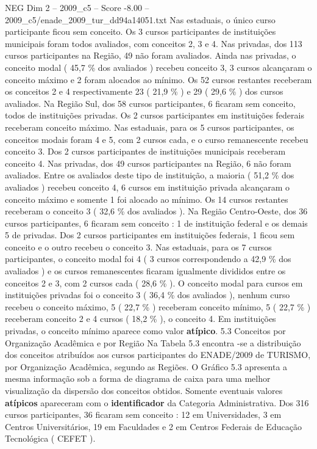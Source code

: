 \begin{textsample}{NEG Dim 2 – 2009\_c5 – Score -8.00 – 2009\_c5/enade\_2009\_tur\_dd94a14051.txt}
Nas estaduais, o único curso participante ficou sem conceito.
Os 3 cursos participantes de instituições municipais foram todos avaliados, com conceitos 2, 3 e 4.
Nas privadas, dos 113 cursos participantes na Região, 49 não foram avaliados.
Ainda nas privadas, o conceito modal ( 45,7 \% dos avaliados ) recebeu conceito 3, 3 cursos alcançaram o conceito máximo e 2 foram alocados ao mínimo.
Os 52 cursos restantes receberam os conceitos 2 e 4 respectivamente 23 ( 21,9 \% ) e 29 ( 29,6 \% ) dos cursos avaliados.
Na Região Sul, dos 58 cursos participantes, 6 ficaram sem conceito, todos de instituições privadas.
Os 2 cursos participantes em instituições federais receberam conceito máximo.
Nas estaduais, para os 5 cursos participantes, os conceitos modais foram 4 e 5, com 2 cursos cada, e o curso remanescente recebeu conceito 3.
Dos 2 cursos participantes de instituições municipais receberam conceito 4.
Nas privadas, dos 49 cursos participantes na Região, 6 não foram avaliados.
Entre os avaliados deste tipo de instituição, a maioria ( 51,2 \% dos avaliados ) recebeu conceito 4, 6 cursos em instituição privada alcançaram o conceito máximo e somente 1 foi alocado ao mínimo.
Os 14 cursos restantes receberam o conceito 3 ( 32,6 \% dos avaliados ).
Na Região Centro-Oeste, dos 36 cursos participantes, 6 ficaram sem conceito : 1 de instituição federal e os demais 5 de privadas.
Dos 2 cursos participantes em instituições federais, 1 ficou sem conceito e o outro recebeu o conceito 3.
Nas estaduais, para os 7 cursos participantes, o conceito modal foi 4 ( 3 cursos correspondendo a 42,9 \% dos avaliados ) e os cursos remanescentes ficaram igualmente divididos entre os conceitos 2 e 3, com 2 cursos cada ( 28,6 \% ).
O conceito modal para cursos em instituições privadas foi o conceito 3 ( 36,4 \% dos avaliados ), nenhum curso recebeu o conceito máximo, 5 ( 22,7 \% ) receberam conceito mínimo, 5 ( 22,7 \% ) receberam conceito 2 e 4 cursos ( 18,2 \% ), o conceito 4.
Em instituições privadas, o conceito mínimo aparece como valor \textbf{atípico}. 5.3 Conceitos por Organização Acadêmica e por Região Na Tabela 5.3 encontra -se a distribuição dos conceitos atribuídos aos cursos participantes do ENADE/2009 de TURISMO, por Organização Acadêmica, segundo as Regiões.
O Gráfico 5.3 apresenta a mesma informação sob a forma de diagrama de caixa para uma melhor visualização da dispersão dos conceitos obtidos.
Somente eventuais valores \textbf{atípicos} apareceram com o \textbf{identificador} da Categoria Administrativa.
Dos 316 cursos participantes, 36 ficaram sem conceito : 12 em Universidades, 3 em Centros Universitários, 19 em Faculdades e 2 em Centros Federais de Educação Tecnológica ( CEFET ).

\end{textsample}
